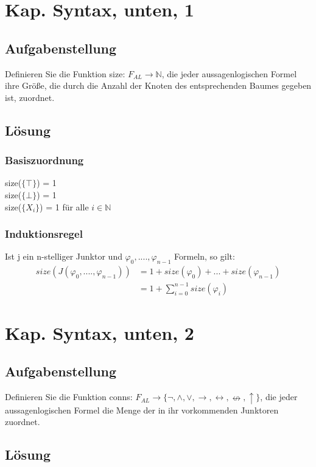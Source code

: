 \documentclass[12pt, a4paper]{article}
\begin{document}
\section*{Kap. Syntax, unten, 1}
\subsection*{Aufgabenstellung}
Definieren Sie die Funktion size: $F_{AL} \rightarrow \mathds{N}$, die jeder aussagenlogischen Formel ihre Größe, die durch die Anzahl der Knoten des entsprechenden Baumes gegeben ist, zuordnet.

\subsection*{Lösung}
\subsubsection*{Basiszuordnung}
size($\{ \top \}$) = 1\\
size($\{ \bot \}$) = 1\\
size($\{ X_i \}$) = 1 für alle $i \in \mathds{N}$
\subsubsection*{Induktionsregel}
Ist j ein n-stelliger Junktor und $\varphi_0,....,\varphi_{n-1}$ Formeln, so gilt:\\
\begin{equation}
\begin{split}
size(J(\varphi_0,....,\varphi_{n-1})) &= 1 + size(\varphi_0) + ... + size(\varphi_{n-1})\\
&= 1 + \sum^{n-1}_{i=0} size(\varphi_i)
\end{split}
\end{equation}

\section*{Kap. Syntax, unten, 2}
\subsection*{Aufgabenstellung}
Definieren Sie die Funktion conns: $ F_{AL} \rightarrow \{ \neg ,\wedge ,\vee ,\rightarrow,\leftrightarrow ,\nleftrightarrow ,\uparrow \} $, die jeder aussagenlogischen Formel die Menge der in ihr vorkommenden Junktoren zuordnet.
\subsection*{Lösung}
\end{document}
